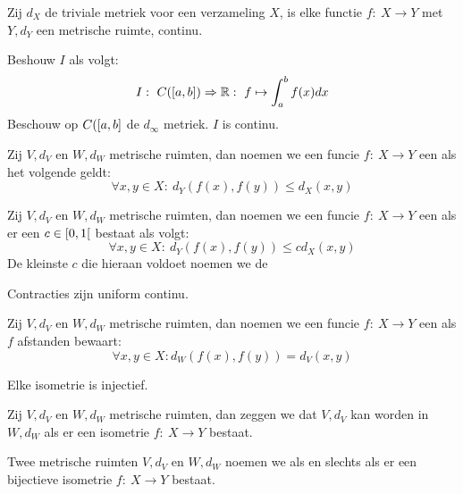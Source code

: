 \documentclass[main.tex]{subfiles}
\begin{document}
\begin{vb}
  Zij $d_{X}$ de triviale metriek voor een verzameling $X$, is elke functie $f:\ X \rightarrow Y$ met $Y,d_{Y}$ een metrische ruimte, continu.
\end{vb}

\begin{vb}
  Beshouw $I$ als volgt:
  \[ I:\ C(\interval{a}{b}) \Rightarrow \mathbb{R}:\ f \mapsto \int_{a}^{b}f(x)dx \]
  Beschouw op $C(\interval{a}{b}$ de $d_{\infty}$ metriek.
  $I$ is continu.
\end{vb}

\begin{de}
  Zij $V,d_{V}$ en $W,d_{W}$ metrische ruimten, dan noemen we een funcie $f:\ X \rightarrow Y$ een  als het volgende geldt:
  \[ \forall x,y\in X:\ d_{Y}(f(x),f(y)) \le d_{X}(x,y) \]
\end{de}

\begin{de}
  Zij $V,d_{V}$ en $W,d_{W}$ metrische ruimten, dan noemen we een funcie $f:\ X \rightarrow Y$ een  als er een $c\in \interval[open right]{0}{1}$ bestaat als volgt:
  \[ \forall x,y\in X:\ d_{Y}(f(x),f(y)) \le c d_{X}(x,y) \]
  De kleinste $c$ die hieraan voldoet noemen we de 
\end{de}

\begin{st}
  Contracties zijn uniform continu.
\end{st}

\begin{de}
  Zij $V,d_{V}$ en $W,d_{W}$ metrische ruimten, dan noemen we een funcie $f:\ X \rightarrow Y$ een  als $f$ afstanden bewaart:
  \[ \forall x,y \in X: d_{W}(f(x),f(y)) = d_{V}(x,y) \]
\end{de}

\begin{st}
  Elke isometrie is injectief.
\end{st}

\begin{de}
  Zij $V,d_{V}$ en $W,d_{W}$ metrische ruimten, dan zeggen we dat $V,d_{V}$  kan worden in $W,d_{W}$ als er een isometrie $f:\ X \rightarrow Y$ bestaat.
\end{de}

\begin{de}
  Twee metrische ruimten $V,d_{V}$ en $W,d_{W}$ noemen we  als en slechts als er een bijectieve isometrie $f:\ X \rightarrow Y$ bestaat.
\end{de}
\end{document}
